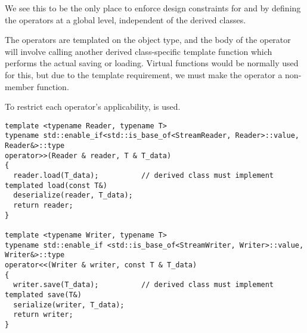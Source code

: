 \documentclass{article}
\begin{document}
We see this to be the only place to enforce design constraints for
 and  by defining the
operators at a global level, independent of the derived classes.

The operators are templated on the object type, and the body of the
operator will involve calling another derived class-specific template
function which performs the actual saving or loading. Virtual
functions would be normally used for this, but due to the template
requirement, we must make the operator a non-member function.

To restrict each operator's applicability,  is
used.

\begin{lstlisting}
template <typename Reader, typename T>
typename std::enable_if<std::is_base_of<StreamReader, Reader>::value, Reader&>::type
operator>>(Reader & reader, T & T_data)
{
  reader.load(T_data);          // derived class must implement templated load(const T&)
  deserialize(reader, T_data);
  return reader;
}

template <typename Writer, typename T>
typename std::enable_if <std::is_base_of<StreamWriter, Writer>::value, Writer&>::type
operator<<(Writer & writer, const T & T_data)
{
  writer.save(T_data);          // derived class must implement templated save(T&)
  serialize(writer, T_data);
  return writer;
}
\end{lstlisting}
\end{document}
